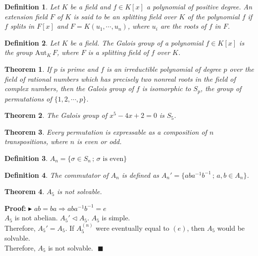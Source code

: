\documentclass[11pt,a4paper]{article}
\newtheorem{definition}{Definition}
\newtheorem{thm}{Theorem}
\begin{document}
\begin{definition}
Let $K$ be a field and $f \in K[x]$ a polynomial of positive degree. An extension field $F$ of $K$ is said to be an splitting field over $K$ of the polynomial $f$ if $f$ splits in $F[x]$ and $F = K(u_1, \cdots, u_n)$, where $u_i$ are the roots of $f$ in $F$.
\end{definition}

\begin{definition}
Let $K$ be a field. The Galois group of a polynomial $f \in K[x]$ is the group $\text{Aut}_K\,F$, where $F$ is a splitting field of $f$ over $K$.
\end{definition}

\begin{thm}
If $p$ is prime and $f$ is an irreductible polynomial of degree $p$ over the field of rational numbers which has precisely two nonreal roots in the field of complex numbers, then the Galois group of $f$ is isomorphic to $S_p$, the group of permutations of $\{1, 2, \cdots, p \}$.
\end{thm}

\begin{thm}
The Galois group of $x^5 - 4x + 2 = 0$ is $S_5$.
\end{thm}

\begin{thm}
Every permutation is expressable as a composition of $n$ transpositions, where $n$ is even or odd.
\end{thm}

\begin{definition}
$A_n = \{\sigma \in S_n \,;\, \sigma \text{ is even} \}$
\end{definition}

\begin{definition}
The commutator of $A_n$ is defined as $A_n' = \{ ab a^{-1} b^{-1}\,;\,a, b \in A_n \}$.
\end{definition}

\begin{thm}
$A_5$ is not solvable.
\end{thm}

\textbf{Proof:} $\blacktriangleright\,\,ab = ba \Rightarrow ab a^{-1} b^{-1} = e$ \\
$A_5$ is not abelian. $A_5' \lhd A_5$. $A_5$ is simple. \\
Therefore, $A_5' = A_5$. If $A_5^{(n)}$ were eventually equal to $(e)$, then $A_5$ would be solvable. \\
Therefore, $A_5$ is not solvable. $\,\,\blacksquare$
\end{document}
